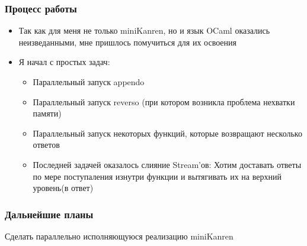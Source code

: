 \documentclass{beamer}
\begin{document}

\begin{frame}
  \frametitle{Процесс работы}
  \begin{itemize}
  \item Так как для меня не только miniKanren, но и язык OCaml оказались неизведанными, мне пришлось помучиться для их освоения
  \item Я начал с простых задач:
  \begin{itemize}
  \item Параллельный запуск appendo
  \item Параллельный запуск reverso (при котором возникла проблема нехватки памяти)
  \item Параллельный запуск некоторых функций, которые возвращают несколько ответов
  \item Последней задачей оказалось слияние Stream'ов: Хотим доставать ответы по мере поступаления изнутри функции и вытягивать их на верхний уровень(в ответ)
  \end{itemize}
  \end{itemize}
  \end{frame}


\begin{frame}[t]
  \frametitle{Дальнейшие планы}
  \begin{center}
    \item Сделать параллельно исполняющуюся реализацию miniKanren
  \end{center}
  
  \end{frame}
\end{document}

